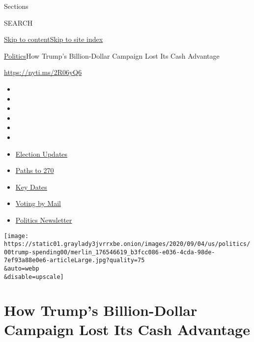 Sections

SEARCH

\protect\hyperlink{site-content}{Skip to
content}\protect\hyperlink{site-index}{Skip to site index}

\href{/section/politics}{Politics}\textbar{}How Trump's Billion-Dollar
Campaign Lost Its Cash Advantage

\url{https://nyti.ms/2R06yQ6}

\begin{itemize}
\item
\item
\item
\item
\item
\item
\end{itemize}

\begin{itemize}
\item
  \href{https://www.nytimes3xbfgragh.onion/live/2020/09/11/us/trump-vs-biden?action=click\&pgtype=Article\&state=default\&region=TOP_BANNER\&context=storylines_menu}{Election
  Updates}
\item
  \href{https://www.nytimes3xbfgragh.onion/interactive/2020/us/elections/election-states-biden-trump.html?action=click\&pgtype=Article\&state=default\&region=TOP_BANNER\&context=storylines_menu}{Paths
  to 270}
\item
  \href{https://www.nytimes3xbfgragh.onion/interactive/2019/us/elections/2020-presidential-election-calendar.html?action=click\&pgtype=Article\&state=default\&region=TOP_BANNER\&context=storylines_menu}{Key
  Dates}
\item
  \href{https://www.nytimes3xbfgragh.onion/interactive/2020/08/31/us/politics/vote-by-mail-deadlines.html?action=click\&pgtype=Article\&state=default\&region=TOP_BANNER\&context=storylines_menu}{Voting
  by Mail}
\item
  \href{https://www.nytimes3xbfgragh.onion/newsletters/politics?action=click\&pgtype=Article\&state=default\&region=TOP_BANNER\&context=storylines_menu}{Politics
  Newsletter}
\end{itemize}

\texttt{[image: https://static01.graylady3jvrrxbe.onion/images/2020/09/04/us/politics/00trump-spending00/merlin\_176546619\_b3fcc086-e036-4cda-98de-7ef93a88e0e6-articleLarge.jpg?quality=75\\\&auto=webp\\\&disable=upscale]}

\hypertarget{how-trumps-billion-dollar-campaign-lost-its-cash-advantage}{%
\section{How Trump's Billion-Dollar Campaign Lost Its Cash
Advantage}\label{how-trumps-billion-dollar-campaign-lost-its-cash-advantage}}


